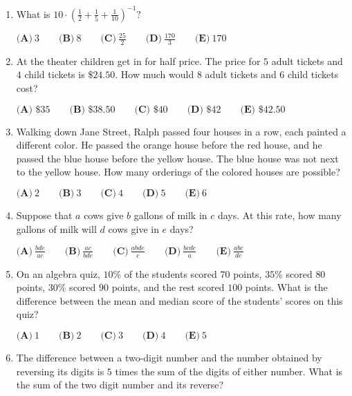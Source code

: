 \documentclass{article}
\begin{document}
\begin{enumerate}[label=\arabic*., itemsep=0.5em]\item What is \(10 \cdot \left(\tfrac{1}{2} + \tfrac{1}{5} + \tfrac{1}{10}\right)^{-1}?\)

\( \textbf{(A)}\ 3\qquad\textbf{(B)}\ 8\qquad\textbf{(C)}\ \frac{25}{2}\qquad\textbf{(D)}\ \frac{170}{3}\qquad\textbf{(E)}\ 170\)\par \vspace{0.5em}\item At the theater children get in for half price.  The price for \(5\) adult tickets and \(4\) child tickets is \(\$24.50\).  How much would \(8\) adult tickets and \(6\) child tickets cost?

\(\textbf{(A) }\$35\qquad
\textbf{(B) }\$38.50\qquad
\textbf{(C) }\$40\qquad
\textbf{(D) }\$42\qquad
\textbf{(E) }\$42.50\)\par \vspace{0.5em}\item Walking down Jane Street, Ralph passed four houses in a row, each painted a different color. He passed the orange house before the red house, and he passed the blue house before the yellow house. The blue house was not next to the yellow house. How many orderings of the colored houses are possible?

\( \textbf{(A)}\ 2\qquad\textbf{(B)}\ 3\qquad\textbf{(C)}\ 4\qquad\textbf{(D)}\ 5\qquad\textbf{(E)}\ 6\)\par \vspace{0.5em}\item Suppose that \(a\) cows give \(b\) gallons of milk in \(c\) days. At this rate, how many gallons of milk will \(d\) cows give in \(e\) days?

\( \textbf{(A)}\ \frac{bde}{ac}\qquad\textbf{(B)}\ \frac{ac}{bde}\qquad\textbf{(C)}\ \frac{abde}{c}\qquad\textbf{(D)}\ \frac{bcde}{a}\qquad\textbf{(E)}\ \frac{abc}{de}\)\par \vspace{0.5em}\item On an algebra quiz, \(10\%\) of the students scored \(70\) points, \(35\%\) scored \(80\) points, \(30\%\) scored \(90\) points, and the rest scored \(100\) points. What is the difference between the mean and median score of the students' scores on this quiz?

\( \textbf{(A)}\ 1\qquad\textbf{(B)}\ 2\qquad\textbf{(C)}\ 3\qquad\textbf{(D)}\ 4\qquad\textbf{(E)}\ 5\)\par \vspace{0.5em}\item The difference between a two-digit number and the number obtained by reversing its digits is \(5\) times the sum of the digits of either number.  What is the sum of the two digit number and its reverse?


\end{enumerate}
\end{document}
